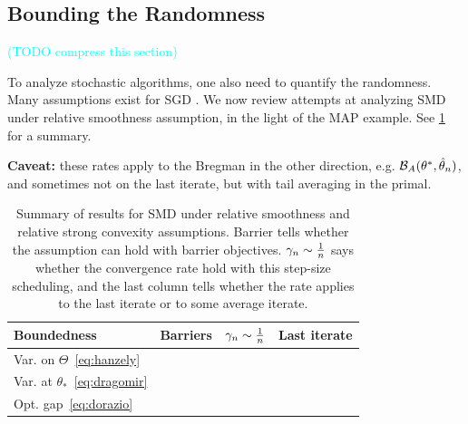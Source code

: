 \documentclass[twoside]{article}
\newcommand{\TODO}[1]{\textcolor{cyan}{(TODO #1)}}
\newcommand*{\expect}[2][]{\ensuremath{\mathbb{E}_{#1} \left[ #2 \right] }} %
\newcommand{\logpart}{A}
\newcommand{\bregman}{\cB_\logpart}
\newcommand{\nat}{\theta}
\newcommand{\m}{\mu}
\newcommand{\lr}{\gamma} %
\newcommand{\MAPt}{\hat \nat_n}
\begin{document}
\subsection{Bounding the Randomness}
\TODO{compress this section}

To analyze stochastic algorithms, one also need to quantify the randomness.
Many assumptions exist for SGD \citep[\S3 for a modern review]{khaled2020better}.
We now review attempts at analyzing SMD under relative smoothness assumption, in the light of  the MAP example.
See \cref{tbl:assumptions} for a summary.

\textbf{Caveat:} these rates apply to the Bregman in the other direction, e.g. $\bregman(\nat^*, \MAPt)$, and sometimes not on the last iterate, but with tail averaging in the primal.

\begin{table}[t]
\begingroup
\newcommand*{\greencmark}{\textcolor{Green}{\cmark}}
\newcommand*{\redxmark}{\textcolor{Red}{\xmark}}
\centering
\caption{Summary of results for SMD
under relative smoothness and relative strong convexity assumptions.
Barrier tells whether the assumption can hold with barrier objectives.
$\lr_n \sim \inv{n}$ says whether the convergence rate hold with this step-size scheduling, and the last column tells whether the rate applies to the last iterate or to some average iterate.
}
\begin{tabular}{lccc}
\toprule
Boundedness & Barriers &  $\lr_n \sim \inv{n}$ & Last iterate \\
\midrule
Var. on $\Theta$~\eqref{eq:hanzely} %
& \redxmark & \greencmark  & \redxmark
\\
Var. at $\theta_*$~\eqref{eq:dragomir} %
& \redxmark & \greencmark  & \greencmark
\\
Opt. gap~\eqref{eq:dorazio} %
& \greencmark & \redxmark & \greencmark
\\
\bottomrule
\end{tabular}
\label{tbl:assumptions}
\endgroup
\end{table}
\end{document}
